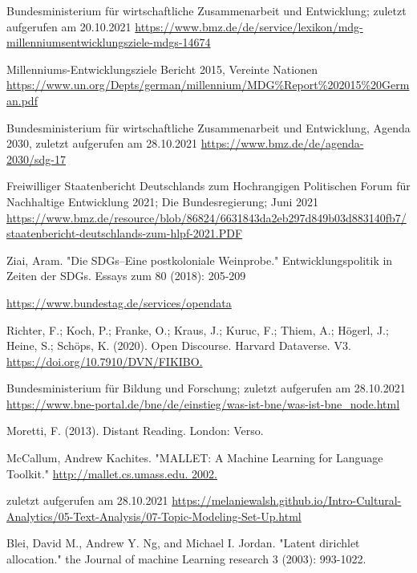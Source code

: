\documentclass[letterpaper]{article}
\begin{document}
\clearpage

\begin{thebibliography}{xxx}
     Bundesministerium für wirtschaftliche Zusammenarbeit und Entwicklung; zuletzt aufgerufen am 20.10.2021
        \url{https://www.bmz.de/de/service/lexikon/mdg-millenniumsentwicklungsziele-mdgs-14674}
        
     Millenniums-Entwicklungsziele Bericht 2015, Vereinte Nationen 
        \url{https://www.un.org/Depts/german/millennium/MDG\%Report\%202015\%20German.pdf}
        
     Bundesministerium für wirtschaftliche Zusammenarbeit und Entwicklung, Agenda 2030, zuletzt aufgerufen am 28.10.2021
        \url{https://www.bmz.de/de/agenda-2030/sdg-17}
        
     Freiwilliger Staatenbericht Deutschlands zum Hochrangigen Politischen Forum für Nachhaltige Entwicklung 2021; Die Bundesregierung; Juni 2021
        \url{https://www.bmz.de/resource/blob/86824/6631843da2eb297d849b03d883140fb7/staatenbericht-deutschlands-zum-hlpf-2021.PDF}
        
     Ziai, Aram. "Die SDGs–Eine postkoloniale Weinprobe." Entwicklungspolitik in Zeiten der SDGs. Essays zum 80 (2018): 205-209
    
        \url{https://www.bundestag.de/services/opendata}
        
     Richter, F.; Koch, P.; Franke, O.; Kraus, J.; Kuruc, F.; Thiem, A.; Högerl, J.; Heine, S.; Schöps, K. (2020). Open Discourse.  Harvard Dataverse. V3.
        \url{https://doi.org/10.7910/DVN/FIKIBO.}
        
     Bundesministerium für Bildung und Forschung; zuletzt aufgerufen am 28.10.2021
        \url{https://www.bne-portal.de/bne/de/einstieg/was-ist-bne/was-ist-bne_node.html}
        
     Moretti, F. (2013). Distant Reading. London: Verso. 
    
     McCallum, Andrew Kachites.  "MALLET: A Machine Learning for Language Toolkit."
        \url{http://mallet.cs.umass.edu. 2002.}
    
     zuletzt aufgerufen am 28.10.2021   
        \url{https://melaniewalsh.github.io/Intro-Cultural-Analytics/05-Text-Analysis/07-Topic-Modeling-Set-Up.html}
        
     Blei, David M., Andrew Y. Ng, and Michael I. Jordan. "Latent dirichlet allocation." the Journal of machine Learning research 3 (2003): 993-1022.
    

\end{thebibliography}
\end{document}
